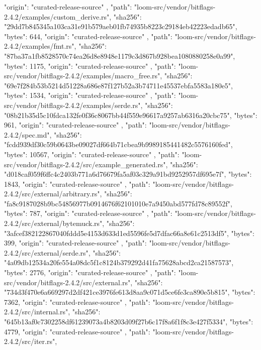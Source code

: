 {{      "origin": "curated-release-source"
    },
    {
      "path": "loom-src/vendor/bitflags-2.4.2/examples/custom_derive.rs",
      "sha256": "29dd7b845345a103ca31e91b579aeb01fb74935b8223c29184eb42223edadb65",
      "bytes": 644,
      "origin": "curated-release-source"
    },
    {
      "path": "loom-src/vendor/bitflags-2.4.2/examples/fmt.rs",
      "sha256": "87ba37a1fb8528570c74ea26d8e8948e1179c3d867b928bea1080880258e0a99",
      "bytes": 1175,
      "origin": "curated-release-source"
    },
    {
      "path": "loom-src/vendor/bitflags-2.4.2/examples/macro_free.rs",
      "sha256": "69e7f284b53b5214d51228a686e87f127b52a3b74711e45537ebfa5583a180e5",
      "bytes": 1534,
      "origin": "curated-release-source"
    },
    {
      "path": "loom-src/vendor/bitflags-2.4.2/examples/serde.rs",
      "sha256": "08b21b35d5c10fdca132fe0f36c8067bb44f559e96617a9257ab6316a20cbc75",
      "bytes": 961,
      "origin": "curated-release-source"
    },
    {
      "path": "loom-src/vendor/bitflags-2.4.2/spec.md",
      "sha256": "fcdd939df30c59b0643be09027df664b71cbea9b9989185441482c5576160fed",
      "bytes": 10567,
      "origin": "curated-release-source"
    },
    {
      "path": "loom-src/vendor/bitflags-2.4.2/src/example_generated.rs",
      "sha256": "d018caf059f6ffc4c2403b771a6d76679fa5af03c329a91bd9252957df695e7f",
      "bytes": 1843,
      "origin": "curated-release-source"
    },
    {
      "path": "loom-src/vendor/bitflags-2.4.2/src/external/arbitrary.rs",
      "sha256": "fa8c9187028b9bc54856977b0914676f62101010e7a9450abd577fd78c89552f",
      "bytes": 787,
      "origin": "curated-release-source"
    },
    {
      "path": "loom-src/vendor/bitflags-2.4.2/src/external/bytemuck.rs",
      "sha256": "3afcef382122867040fddd5e4153d633d1ed5596fe5d7dfac66a8e61c2513df5",
      "bytes": 399,
      "origin": "curated-release-source"
    },
    {
      "path": "loom-src/vendor/bitflags-2.4.2/src/external/serde.rs",
      "sha256": "4a09db12534a20fe554a08dc5f1c8124b379292d41fa75628abcd2ca21587573",
      "bytes": 2776,
      "origin": "curated-release-source"
    },
    {
      "path": "loom-src/vendor/bitflags-2.4.2/src/external.rs",
      "sha256": "734d3f470e6a669297d2df421ce3976fe613d8aa9c071d5ce6fe3ca890e5b815",
      "bytes": 7362,
      "origin": "curated-release-source"
    },
    {
      "path": "loom-src/vendor/bitflags-2.4.2/src/internal.rs",
      "sha256": "645b13af0c7302258df61239073a4b8203d09f27b6c17f8a6f1f8c3e427f5334",
      "bytes": 4779,
      "origin": "curated-release-source"
    },
    {
      "path": "loom-src/vendor/bitflags-2.4.2/src/iter.rs",
}}
